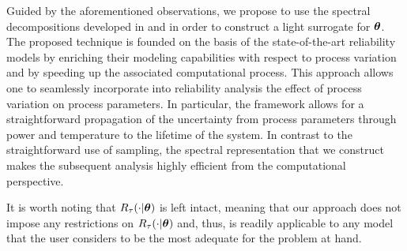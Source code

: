 Guided by the aforementioned observations, we propose to use the spectral decompositions developed in  and  in order to construct a light surrogate for $\bm{\theta}$.
The proposed technique is founded on the basis of the state-of-the-art reliability models by enriching their modeling capabilities with respect to process variation and by speeding up the associated computational process.
This approach allows one to seamlessly incorporate into reliability analysis the effect of process variation on process parameters.
In particular, the framework allows for a straightforward propagation of the uncertainty from process parameters through power and temperature to the lifetime of the system.
In contrast to the straightforward use of  sampling, the spectral representation that we construct makes the subsequent analysis highly efficient from the computational perspective.

It is worth noting that $R_\tau(\cdot | \bm{\theta})$ is left intact, meaning that our approach does not impose any restrictions on $R_\tau(\cdot | \bm{\theta})$ and, thus, is readily applicable to any model that the user considers to be the most adequate for the problem at hand.
